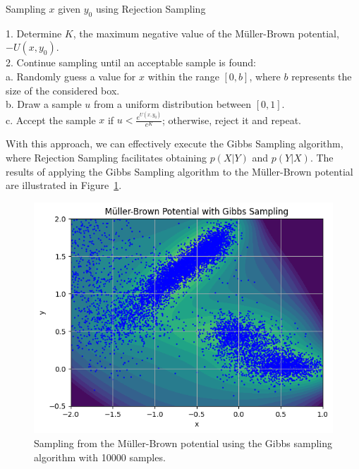 \documentclass{report}
\begin{document}
\begin{center}
	\begin{minipage}{0.7\linewidth}
		\begin{algorithm}[H]
			\caption{Sampling $x$ given $y_0$ using Rejection Sampling} %
			1. Determine \(K\), the maximum negative value of the Müller-Brown potential, \( -U(x, y_0) \). \\
			2. Continue sampling until an acceptable sample is found: \\
			\hspace*{0.5cm} a. Randomly guess a value for \(x\) within the range \([0, b]\), where \(b\) represents the size of the considered box. \\
			\hspace*{0.5cm} b. Draw a sample \(u\) from a uniform distribution between \([0,1]\). \\
			\hspace*{0.5cm} c. Accept the sample \(x\) if \(u < \frac{e^{U(x,y_0)}}{e^{K}}\); otherwise, reject it and repeat. \\
			\label{alg:Gibbs-Sampling-Muller-Brown}   %
		\end{algorithm}
	\end{minipage}
\end{center}

With this approach, we can effectively execute the Gibbs Sampling algorithm, where Rejection Sampling facilitates obtaining \(p(X | Y)\) and \(p(Y | X)\). The results of applying the Gibbs Sampling algorithm to the Müller-Brown potential are illustrated in Figure~\ref{fig:mullerbrowngibbs}.

\begin{figure}[H]
	\centering
	\includegraphics[width=0.5\linewidth]{./Figures/MCMC/mullerbrowngibbs.png}
	\caption{Sampling from the Müller-Brown potential using the Gibbs sampling algorithm with 10000 samples.}
	\label{fig:mullerbrowngibbs}
\end{figure}
\end{document}
